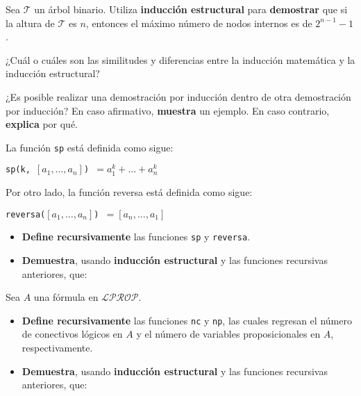 \documentclass[oneside]{style}
\begin{document}
\begin{questions}[label=\protect\circled{\bfseries\arabic*}]
    \question
    {
        Sea $\mathcal{T}$ un árbol binario. Utiliza \textbf{inducción 
        estructural} para \textbf{demostrar} que si la altura de $\mathcal{T}$ 
        es $n$, entonces el máximo número de nodos internos es de $2^{n-1}-1$.
    }

    \question
    {
        ¿Cuál o cuáles son las similitudes y diferencias entre la inducción 
        matemática y la inducción estructural?
    }

    \question
    {
        ¿Es posible realizar una demostración por inducción dentro de otra 
        demostración por inducción? En caso afirmativo, \textbf{muestra} un
        ejemplo. En caso contrario, \textbf{explica} por qué.  
    }

    \question
    {
        La función \texttt{sp} está definida como sigue:
        \begin{center}
            \texttt{sp(k, $[a_1, \ldots, a_n]$) $= a_1^k + \ldots + a_n^k$}
        \end{center}

        Por otro lado, la función reversa está definida como sigue:
        \begin{center}
            \texttt{reversa($[a_1, \ldots, a_n]$) $= [a_n, \ldots, a_1]$}
        \end{center}

        \begin{itemize}
            \item \textbf{Define recursivamente} las funciones \texttt{sp} y 
            \texttt{reversa}. 

            \item \textbf{Demuestra}, usando \textbf{inducción estructural} y 
            las funciones recursivas anteriores, que:  
            \begin{center}
            \end{center}
        \end{itemize}
    }

    \question
    {
        Sea $A$ una fórmula en $\mathcal{LPROP}$. 
        \begin{itemize}
            \item \textbf{Define recursivamente} las funciones \texttt{nc} y 
            \texttt{np}, las cuales regresan el número de conectivos lógicos en 
            $A$ y el número de variables proposicionales en $A$, respectivamente. 
            \item \textbf{Demuestra}, usando \textbf{inducción estructural} y 
            las funciones recursivas anteriores, que: 
            \begin{center}
            \end{center}
        \end{itemize}
    }
\end{questions}
\end{document}
